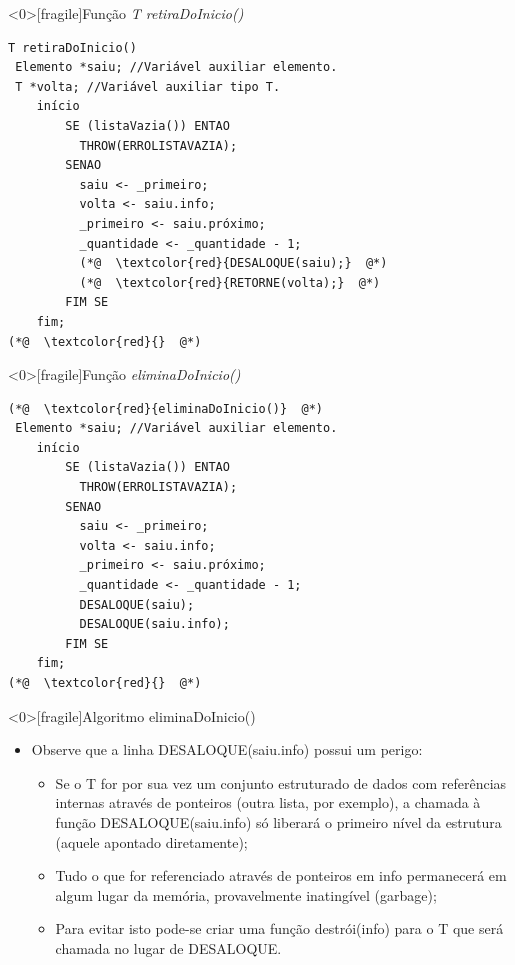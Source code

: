 \documentclass[12pt,table,xcolor={dvipsnames}]{beamer}
\begin{document}
\begin{frame}<0>[fragile]{Função \textit{T retiraDoInicio()}}
\begin{lstlisting}
T retiraDoInicio()
 Elemento *saiu; //Variável auxiliar elemento.
 T *volta; //Variável auxiliar tipo T.
	início
		SE (listaVazia()) ENTAO
		  THROW(ERROLISTAVAZIA);
		SENAO
		  saiu <- _primeiro;
		  volta <- saiu.info;
		  _primeiro <- saiu.próximo;
		  _quantidade <- _quantidade - 1;
		  (*@  \textcolor{red}{DESALOQUE(saiu);}  @*)
		  (*@  \textcolor{red}{RETORNE(volta);}  @*)
		FIM SE
	fim;
(*@  \textcolor{red}{}  @*)
\end{lstlisting}
\end{frame}

\begin{frame}<0>[fragile]{Função \textit{eliminaDoInicio()}}
\begin{lstlisting}
(*@  \textcolor{red}{eliminaDoInicio()}  @*)
 Elemento *saiu; //Variável auxiliar elemento.
	início
		SE (listaVazia()) ENTAO
		  THROW(ERROLISTAVAZIA);
		SENAO
		  saiu <- _primeiro;
		  volta <- saiu.info;
		  _primeiro <- saiu.próximo;
		  _quantidade <- _quantidade - 1;
		  DESALOQUE(saiu);
		  DESALOQUE(saiu.info);
		FIM SE
	fim;
(*@  \textcolor{red}{}  @*)
\end{lstlisting}
\end{frame}

\begin{frame}<0>[fragile]{Algoritmo eliminaDoInicio()}
\begin{itemize}
\item Observe que a linha DESALOQUE(saiu.info) possui um perigo:
\begin{itemize}
\item Se o T for por sua vez um conjunto estruturado de dados com referências internas através de ponteiros (outra lista, por exemplo), a chamada à função DESALOQUE(saiu.info) só liberará o primeiro nível da estrutura (aquele apontado diretamente);
\item Tudo o que for referenciado através de ponteiros em info permanecerá em algum lugar da memória, provavelmente inatingível (garbage);
\item Para evitar isto pode-se criar uma função destrói(info) para o T que será chamada no lugar de DESALOQUE.
\end{itemize}
\end{itemize}
\end{frame}
\end{document}
